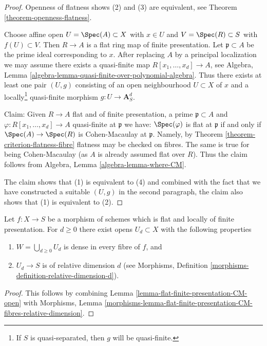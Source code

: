 \begin{proof}
Openness of flatness shows (2) and (3)
are equivalent, see Theorem \ref{theorem-openness-flatness}.

\medskip\noindent
Choose affine open $U = \Spec(A) \subset X$ with $x \in U$ and
$V = \Spec(R) \subset S$ with $f(U) \subset V$. Then $R \to A$
is a flat ring map of finite presentation. Let $\mathfrak p \subset A$
be the prime ideal corresponding to $x$. After replacing $A$ by a
principal localization we may assume there exists a quasi-finite map
$R[x_1, \ldots, x_d]  \to A$, see
Algebra, Lemma \ref{algebra-lemma-quasi-finite-over-polynomial-algebra}.
Thus there exists at least one pair $(U, g)$ consisting of an
open neighbourhood $U \subset X$ of $x$ and a locally\footnote{If $S$
is quasi-separated, then $g$ will be quasi-finite.} quasi-finite morphism
$g : U \to \mathbf{A}^d_S$.

\medskip\noindent
Claim: Given $R \to A$ flat and of finite presentation, a prime
$\mathfrak p \subset A$ and $\varphi : R[x_1, \ldots, x_d] \to A$
quasi-finite at $\mathfrak p$ we have: $\Spec(\varphi)$
is flat at $\mathfrak p$ if and only if $\Spec(A) \to \Spec(R)$
is Cohen-Macaulay at $\mathfrak p$.  Namely, by
Theorem \ref{theorem-criterion-flatness-fibre}
flatness may be checked on fibres. The same is true
for being Cohen-Macaulay (as $A$ is already assumed flat over $R$).
Thus the claim follows from
Algebra, Lemma \ref{algebra-lemma-where-CM}.

\medskip\noindent
The claim shows that (1) is equivalent to (4) and combined with the
fact that we have constructed a suitable $(U, g)$ in the second
paragraph, the claim also shows that (1) is equivalent to (2).
\end{proof}

\begin{lemma}
\label{lemma-flat-finite-presentation-CM-pieces}
Let $f : X \to S$ be a morphism of schemes which is flat and locally
of finite presentation. For $d \geq 0$ there exist opens $U_d \subset X$
with the following properties
\begin{enumerate}
\item $W = \bigcup_{d \geq 0} U_d$ is dense in every fibre of $f$, and
\item $U_d \to S$ is of relative dimension $d$ (see
Morphisms, Definition \ref{morphisms-definition-relative-dimension-d}).
\end{enumerate}
\end{lemma}

\begin{proof}
This follows by combining
Lemma \ref{lemma-flat-finite-presentation-CM-open}
with
Morphisms, Lemma
\ref{morphisms-lemma-flat-finite-presentation-CM-fibres-relative-dimension}.
\end{proof}

